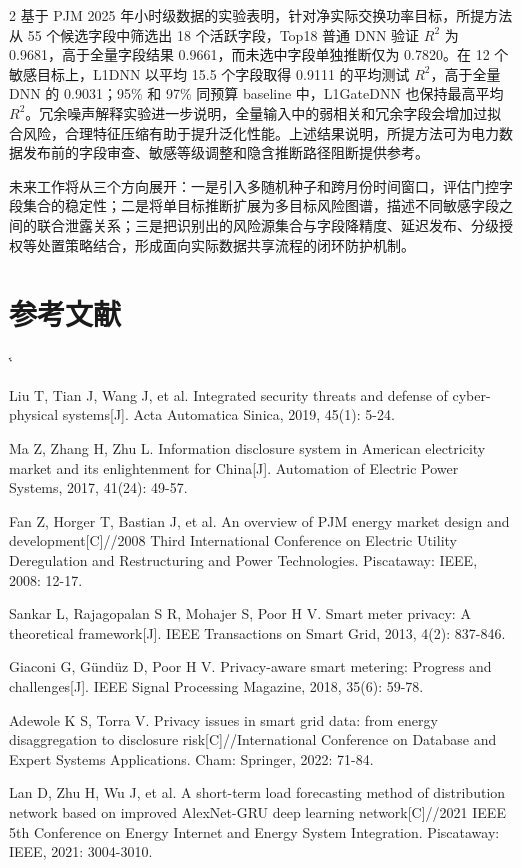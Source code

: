 \documentclass[UTF8,zihao=5,twoside]{ctexart}
\makeatletter
\numberwithin{equation}{section}
\renewcommand{\refname}{参考文献}
\renewenvironment{thebibliography}[1]{%
  \section*{\refname}%
  \small
  \list{[\arabic{enumi}]}{%
    \settowidth\labelwidth{[#1]}%
    \leftmargin\labelwidth
    \advance\leftmargin\labelsep
    \usecounter{enumi}}
  \sloppy\clubpenalty4000\widowpenalty4000\sfcode`\.\@m
}{\def\@noitemerr{\@latex@warning{Empty `thebibliography' environment}}\endlist}
\makeatother
\begin{document}
\begin{multicols}{2}
基于 PJM 2025 年小时级数据的实验表明，针对净实际交换功率目标，所提方法从 55 个候选字段中筛选出 18 个活跃字段，Top18 普通 DNN 验证 $R^2$ 为 0.9681，高于全量字段结果 0.9661，而未选中字段单独推断仅为 0.7820。在 12 个敏感目标上，L1DNN 以平均 15.5 个字段取得 0.9111 的平均测试 $R^2$，高于全量 DNN 的 0.9031；95\% 和 97\% 同预算 baseline 中，L1GateDNN 也保持最高平均 $R^2$。冗余噪声解释实验进一步说明，全量输入中的弱相关和冗余字段会增加过拟合风险，合理特征压缩有助于提升泛化性能。上述结果说明，所提方法可为电力数据发布前的字段审查、敏感等级调整和隐含推断路径阻断提供参考。

未来工作将从三个方向展开：一是引入多随机种子和跨月份时间窗口，评估门控字段集合的稳定性；二是将单目标推断扩展为多目标风险图谱，描述不同敏感字段之间的联合泄露关系；三是把识别出的风险源集合与字段降精度、延迟发布、分级授权等处置策略结合，形成面向实际数据共享流程的闭环防护机制。

\balance
\begin{thebibliography}{99}
Liu T, Tian J, Wang J, et al. Integrated security threats and defense of cyber-physical systems[J]. Acta Automatica Sinica, 2019, 45(1): 5-24.

Ma Z, Zhang H, Zhu L. Information disclosure system in American electricity market and its enlightenment for China[J]. Automation of Electric Power Systems, 2017, 41(24): 49-57.

Fan Z, Horger T, Bastian J, et al. An overview of PJM energy market design and development[C]//2008 Third International Conference on Electric Utility Deregulation and Restructuring and Power Technologies. Piscataway: IEEE, 2008: 12-17.

Sankar L, Rajagopalan S R, Mohajer S, Poor H V. Smart meter privacy: A theoretical framework[J]. IEEE Transactions on Smart Grid, 2013, 4(2): 837-846.

Giaconi G, Gündüz D, Poor H V. Privacy-aware smart metering: Progress and challenges[J]. IEEE Signal Processing Magazine, 2018, 35(6): 59-78.

Adewole K S, Torra V. Privacy issues in smart grid data: from energy disaggregation to disclosure risk[C]//International Conference on Database and Expert Systems Applications. Cham: Springer, 2022: 71-84.

Lan D, Zhu H, Wu J, et al. A short-term load forecasting method of distribution network based on improved AlexNet-GRU deep learning network[C]//2021 IEEE 5th Conference on Energy Internet and Energy System Integration. Piscataway: IEEE, 2021: 3004-3010.


\end{thebibliography}
\end{multicols}
\end{document}
